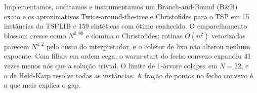 \begin{abstract}
We implement, audit and profile an exact Branch-and-Bound (B\&B) and the
Twice-around-the-tree and Christofides approximations for the TSP on 15
TSPLIB and 159 synthetic instances with known optima. The blossom matching
grows as $N^{2.89}$ and dominates Christofides, while vectorized $O(n^2)$
routines behave like $N^{1.2}$ due to interpreter overhead; garbage
collection changed no fitted exponent. With blind child ordering, the
convex-hull warm-start expanded 41 times fewer nodes than the trivial tour.
The 1-tree bound collapses at $N=22$, while Held-Karp solves all instances.
The fraction of points on the convex hull best predicts the gap.
\end{abstract}

\begin{resumo}
Implementamos, auditamos e instrumentamos um Branch-and-Bound (B\&B) exato
e os aproximativos Twice-around-the-tree e Christofides para o TSP em 15
instâncias da TSPLIB e 159 sintéticas com ótimo conhecido. O emparelhamento
blossom cresce como $N^{2{,}89}$ e domina o Christofides; rotinas $O(n^2)$
vetorizadas parecem $N^{1{,}2}$ pelo custo do interpretador, e o coletor de
lixo não alterou nenhum expoente. Com filhos em ordem cega, o warm-start do
fecho convexo expandiu 41 vezes menos nós que a solução trivial. O limite
de 1-árvore colapsa em $N=22$, e o de Held-Karp resolve todas as
instâncias. A fração de pontos no fecho convexo é a que mais explica o gap.
\end{resumo}
